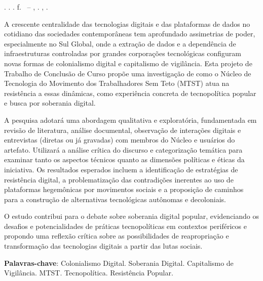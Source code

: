 
\begin{resumo}[RESUMO]
\begin{SingleSpacing}

\imprimirautorcitacao. \imprimirtitulo. \imprimirdata. \pageref{LastPage} f. \imprimirprojeto\ – \imprimirprograma, \imprimirinstituicao. \imprimirlocal, \imprimirdata.\par

A crescente centralidade das tecnologias digitais e das plataformas de dados no cotidiano das sociedades contemporâneas tem aprofundado assimetrias de poder, especialmente no Sul Global, onde a extração de dados e a dependência de infraestruturas controladas por grandes corporações tecnológicas configuram novas formas de colonialismo digital e capitalismo de vigilância. Esta projeto de Trabalho de Conclusão de Curso propõe uma investigação de como o Núcleo de Tecnologia do Movimento dos Trabalhadores Sem Teto (MTST) atua na resistência a essas dinâmicas, como experiência concreta de tecnopolítica popular e busca por soberania digital.

A pesquisa adotará uma abordagem qualitativa e exploratória, fundamentada em revisão de literatura, análise documental, observação de interações digitais e entrevistas (diretas ou já gravadas) com membros do Núcleo e usuários do artefato. Utilizará a análise crítica do discurso e categorização temática para examinar tanto os aspectos técnicos quanto as dimensões políticas e éticas da iniciativa. Os resultados esperados incluem a identificação de estratégias de resistência digital, a problematização das contradições inerentes ao uso de plataformas hegemônicas por movimentos sociais e a proposição de caminhos para a construção de alternativas tecnológicas autônomas e decoloniais.

O estudo contribui para o debate sobre soberania digital popular, evidenciando os desafios e potencialidades de práticas tecnopolíticas em contextos periféricos e propondo uma reflexão crítica sobre as possibilidades de reapropriação e transformação das tecnologias digitais a partir das lutas sociais.

\textbf{Palavras-chave}: Colonialismo Digital. Soberania Digital. Capitalismo de Vigilância. MTST. Tecnopolítica. Resistência Popular.
\end{SingleSpacing}
\end{resumo}

